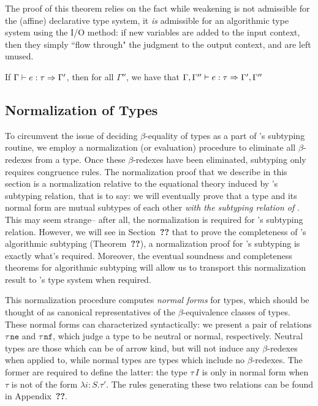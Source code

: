 The proof of this theorem relies on the fact while weakening is not admissible for the (affine) declarative type system, it \textit{is} admissible for an algorithmic type system using the I/O method: if new variables are added to the input context, then they simply ``flow through" the judgment to the output context, and are left unused.

\begin{theorem}
If $\Gamma \vdash e : \tau \Rightarrow \Gamma'$, then for all $\Gamma''$, we have that $\Gamma,\Gamma'' \vdash e : \tau \Rightarrow \Gamma',\Gamma''$
\end{theorem}

\subsection{Normalization of Types}
To circumvent the issue of deciding $\beta$-equality of types as a part of \bilambdaamor's subtyping routine, we employ a normalization (or evaluation) procedure to eliminate all $\beta$-redexes from a type. Once these $\beta$-redexes have been eliminated, subtyping only requires congruence rules. The normalization proof that we describe in this section is a normalization relative to the equational theory induced by \dlambdaamor's subtyping relation, that is to say: we will eventually prove that a type and its normal form are mutual subtypes of each other \textit{with the subtyping relation of \dlambdaamor}. This may seem strange-- after all, the normalization is required for \bilambdaamor's subtyping relation. However, we will see in Section~\textbf{??} that to prove the completeness of \bilambdaamor's algorithmic subtyping (Theorem~\textbf{??}), a normalization proof for \dlambdaamor's subtyping is exactly what's required. Moreover, the eventual soundness and completeness theorems for algorithmic subtyping will allow us to transport this normalization result to \bilambdaamor's type system when required.

This normalization procedure computes \textit{normal forms} for types, which should be thought of as canonical representatives of the $\beta$-equivalence classes of types. These normal forms can characterized syntactically: we present a pair of relations $\tau \, \texttt{ne}$ and $\tau \, \texttt{nf}$, which judge a type to be neutral or normal, respectively. Neutral types are those which can be of arrow kind, but will not induce any $\beta$-redexes when applied to, while normal types are types which include no $\beta$-redexes. The former are required to define the latter: the type $\tau \, I$ is only in normal form when $\tau$ is not of the form $\lambda i : S.\tau'$. The rules generating these two relations can be found in Appendix~\textbf{??}.

